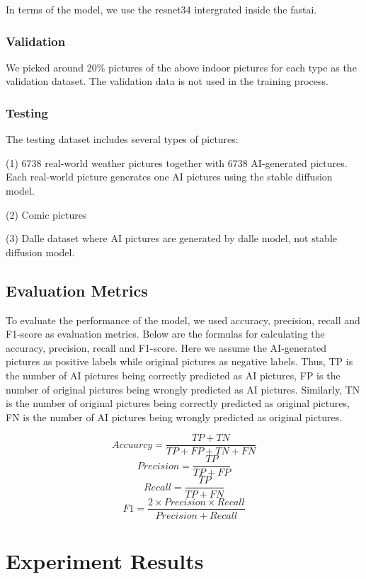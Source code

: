 \documentclass[11pt]{article}
\begin{document}
In terms of the model, we use the resnet34 intergrated inside the fastai.

\subsubsection{Validation}

We picked around 20\% pictures of the above indoor pictures for each type as the validation dataset. The validation data is not used in the training process.

\subsubsection{Testing}

The testing dataset includes several types of pictures:

(1) 6738 real-world weather pictures together with 6738 AI-generated pictures. Each real-world picture generates one AI pictures using the stable diffusion model.

(2) Comic pictures

(3) Dalle dataset where AI pictures are generated by dalle model, not stable diffusion model.

\subsection{Evaluation Metrics}

To evaluate the performance of the model, we used accuracy, precision, recall and F1-score as evaluation metrics. Below are the formulas for calculating the accuracy, precision, recall and F1-score. Here we assume the AI-generated pictures as positive labels while original pictures as negative labels. Thus, TP is the number of AI pictures being correctly predicted as AI pictures, FP is the number of original pictures being wrongly predicted as AI pictures. Similarly, TN is the number of original pictures being correctly predicted as original pictures, FN is the number of AI pictures being wrongly predicted as original pictures.

\[
Accuarcy = \frac{TP+TN}{TP+FP+TN+FN}
\]
\[
Precision = \frac{TP}{TP+FP}
\]
\[
Recall = \frac{TP}{TP+FN}
\]
\[
F1 = \frac{2 \times Precision \times Recall}{Precision + Recall}
\]


\section{Experiment Results}
\end{document}
